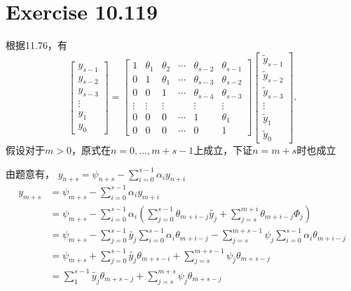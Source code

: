 \documentclass[twoside,a4paper]{article}
\begin{document}
\section{Exercise 10.119}
    根据11.76，有
    $$\left[\begin{array}{c}
      y_{s-1} \\
      y_{s-2} \\
      y_{s-3} \\
      \vdots \\
      y_{1} \\
      y_{0}
      \end{array}\right]=\left[\begin{array}{cccccc}
          1 & \theta_{1} & \theta_{2} & \cdots & \theta_{s-2} & \theta_{s-1} \\
          0 & 1 & \theta_{1} & \cdots & \theta_{s-3} & \theta_{s-2} \\
          0 & 0 & 1 & \cdots & \theta_{s-4} & \theta_{s-3} \\
          \vdots & \vdots & \vdots & & \vdots & \vdots \\
          0 & 0 & 0 & \cdots & 1 & \theta_{1} \\
          0 & 0 & 0 & \cdots & 0 & 1
          \end{array}\right] \left[\begin{array}{c}
              \tilde{y}_{s-1} \\
              \tilde{y}_{s-2} \\
              \tilde{y}_{s-3} \\
              \vdots \\
              \tilde{y}_{1} \\
              \tilde{y}_{0}
              \end{array}\right].$$
    假设对于$m>0$，原式在$n=0,...,m+s-1$上成立，下证$n=m+s$时也成立

    由题意有， $y_{n+s} = \psi_{n+s} - \sum_{i=0}^{s-1}\alpha_iy_{n+i}$
    $$\begin{aligned}
      y_{m+s} &= \psi_{m+s} - \sum_{i=0}^{s-1}\alpha_iy_{m+i}\\
      &=\psi_{m+s} - \sum_{i=0}^{s-1}\alpha_i(\sum_{j = 0}^{s-1}\theta_{m+i-j}\tilde{y_j}+\sum_{j=s}^{m+i}\theta_{m+i-j}\Phi_j)\\
      &=\psi_{m+s} - \sum_{j=0}^{s-1}\tilde{y_j}\sum_{i=0}^{s-1}\alpha_i\theta_{m+i-j}-\sum_{j=s}^{m+s-1}\psi_j\sum_{i=0}^{s-1}\alpha_i\theta_{m+i-j}\\
      &=\psi_{m+s} + \sum_{j=0}^{s-1}\tilde{y_j}\theta_{m+s-i} + \sum_{j=s}^{m+s-1}\psi_j\theta_{m+s-j}\\
      &=\sum_{1}^{s-1}\tilde{y_j}\theta_{m+s-j}+\sum_{j=s}^{m+s}\psi_j\theta_{m+s-j}
  \end{aligned}
  $$
\end{document}
